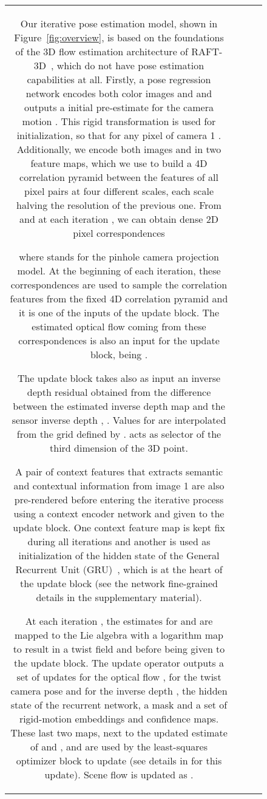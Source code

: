\documentclass{article}
\begin{document}
\begin{figure}
\begin{tabular}{cccc}
Our iterative pose estimation model, shown in Figure~\ref{fig:overview}, is based on the foundations of the 3D flow estimation architecture of RAFT-3D~\cite{teed2021raft}, which do not have pose estimation capabilities at all. Firstly, a pose regression network encodes both color images  and  and outputs a initial pre-estimate for the camera motion . This rigid transformation is used for initialization, so that for any  pixel of camera 1  . Additionally, we encode both images  and  in two feature maps, which we use to build a 4D correlation pyramid between the features of all pixel pairs at four different scales, each scale halving the resolution of the previous one. From  and   at each iteration , we can obtain dense 2D pixel correspondences 

where  stands for the pinhole camera projection model. At the beginning of each iteration, these correspondences are used to sample the correlation features from the fixed 4D correlation pyramid and it is one of the inputs of the update block. The estimated optical flow  coming from these correspondences is also an input for the update block, being . 

The update block takes also as input an inverse depth residual obtained from the difference between the estimated inverse depth map  and the sensor inverse depth , . Values for  are interpolated from the grid defined by .   acts as selector of the third dimension of the 3D point.

A pair of context features that extracts semantic and contextual information from image 1 are also pre-rendered before entering the iterative process using a context encoder network and given to the update block. One context feature map is kept fix during all iterations and another is used as initialization of the hidden state of the General Recurrent Unit (GRU)~\cite{cho2014properties}, which is at the heart of the update block (see the network fine-grained details in the supplementary material). 

At each iteration , the estimates for  and  are mapped to the Lie algebra with a logarithm map to result in a twist field  and  before being given to the update block. The update operator outputs a set of updates for the optical flow , for the twist camera pose  and for the inverse depth , the hidden state of the recurrent network, a mask and a set of rigid-motion embeddings and confidence maps. These last two maps, next to the updated estimate of  and , and  are used by the least-squares optimizer block to update  (see details in \cite{teed2021raft} for this update). Scene flow is updated as .


\end{tabular}
\end{figure}
\end{document}
